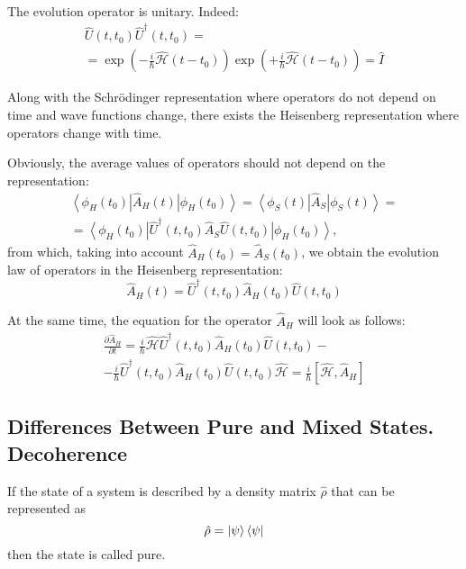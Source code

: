 The evolution operator is unitary. Indeed:
\begin{eqnarray}
\hat{U}\left(t,t_0\right)\hat{U}^\dag\left(t,t_0\right) = 
\nonumber \\
= \exp\left( -\frac{i}{\hbar} \hat{\mathcal{H}} \left( t - t_0 \right)
\right)
\exp\left( +\frac{i}{\hbar} \hat{\mathcal{H}} \left( t - t_0 \right)
\right)
= \hat{I}
\nonumber
\end{eqnarray}

Along with the Schrödinger representation where operators do not depend on time and wave functions change, there exists the Heisenberg representation where operators change with time.

Obviously, the average values of operators should not depend on the representation:
\begin{eqnarray}
\left< \phi_H\left(t_0\right) \right|\hat{A}_H\left(t\right)\left| 
\phi_H\left(t_0\right) \right> = 
\left< \phi_S\left(t\right) \right|\hat{A}_S\left| 
\phi_S\left(t\right) \right> = 
\nonumber \\
=
\left<
\phi_H\left(t_0\right)\right|\hat{U}^\dag\left(t,t_0\right)\hat{A}_S\hat{U}\left(t,t_0\right)\left|
\phi_H\left(t_0\right) \right>,
\nonumber
\end{eqnarray}
from which, taking into account $\hat{A}_H\left(t_0\right) = \hat{A}_S\left(t_0\right)$, we obtain the evolution law of operators in the Heisenberg representation:
\begin{equation}
\hat{A}_H\left(t\right) = \hat{U}^\dag\left(t,t_0\right)\hat{A}_H\left(t_0\right)\hat{U}\left(t,t_0\right)
\label{eqAddWaveFunc_HeizenbergU}
\end{equation}

At the same time, the equation for the operator $\hat{A}_H$ will look as follows:
\begin{eqnarray}
  \frac{\partial \hat{A}_H}{\partial t} =
  \frac{i}{\hbar} \hat{\mathcal{H}}
  \hat{U}^\dag\left(t,t_0\right)\hat{A}_H\left(t_0\right)\hat{U}\left(t,t_0\right)
  -
  \nonumber \\
  - \frac{i}{\hbar}
  \hat{U}^\dag\left(t,t_0\right)\hat{A}_H\left(t_0\right)\hat{U}\left(t,t_0\right)
  \hat{\mathcal{H}} =
  \frac{i}{\hbar} \left[\hat{\mathcal{H}}, \hat{A}_H \right]
  \label{eqAddWaveFunc_HeizenbergT}
\end{eqnarray}

\subsection{Differences Between Pure and Mixed States. Decoherence}
\begin{definition}
If the state of a system is described by a density matrix $\hat{\rho}$ that can be represented as 
\begin{equation}
\hat{\rho} = \ket{\psi}\bra{\psi}
\label{eq:add:quant:purestate}
\end{equation}
then the state is called pure.
\end{definition}

